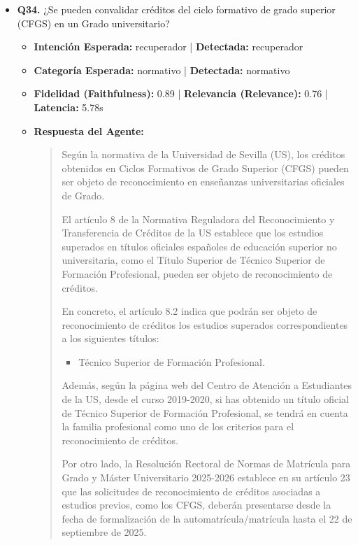 \documentclass[12pt,a4paper,oneside]{report}
\begin{document}
\begin{itemize}
  
\item \textbf{Q34.} ¿Se pueden convalidar créditos del ciclo formativo de grado superior (CFGS) en un Grado universitario? \\
        \begin{itemize}
          \item \textbf{Intención Esperada:} recuperador | \textbf{Detectada:} recuperador
          \item \textbf{Categoría Esperada:} normativo | \textbf{Detectada:} normativo
          \item \textbf{Fidelidad (Faithfulness):} 0.89 | \textbf{Relevancia (Relevance):} 0.76 | \textbf{Latencia:} 5.78s
          \item \textbf{{Respuesta del Agente:}} \\
                \begin{quote}
Según la normativa de la Universidad de Sevilla (US), los créditos obtenidos en Ciclos Formativos de Grado Superior (CFGS) pueden ser objeto de reconocimiento en enseñanzas universitarias oficiales de Grado.

El artículo 8 de la Normativa Reguladora del Reconocimiento y Transferencia de Créditos de la US establece que los estudios superados en títulos oficiales españoles de educación superior no universitaria, como el Título Superior de Técnico Superior de Formación Profesional, pueden ser objeto de reconocimiento de créditos.

En concreto, el artículo 8.2 indica que podrán ser objeto de reconocimiento de créditos los estudios superados correspondientes a los siguientes títulos:

\begin{itemize}
  \item Técnico Superior de Formación Profesional.
\end{itemize}

Además, según la página web del Centro de Atención a Estudiantes de la US, desde el curso 2019-2020, si has obtenido un título oficial de Técnico Superior de Formación Profesional, se tendrá en cuenta la familia profesional como uno de los criterios para el reconocimiento de créditos.

Por otro lado, la Resolución Rectoral de Normas de Matrícula para Grado y Máster Universitario 2025-2026 establece en su artículo 23 que las solicitudes de reconocimiento de créditos asociadas a estudios previos, como los CFGS, deberán presentarse desde la fecha de formalización de la automatrícula/matrícula hasta el 22 de septiembre de 2025.


\end{quote}
\end{itemize}
\end{itemize}
\end{document}
